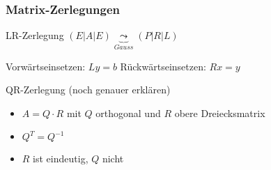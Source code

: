 \subsubsection{Matrix-Zerlegungen}

\begin{KR}{LR-Zerlegung}
    $(E | A | E) \underbrace{\leadsto}_{Gauss} (P | R | L)$
    
    Vorwärtseinsetzen: $Ly = b$
    Rückwärtseinsetzen: $Rx = y$
\end{KR}

\begin{KR}{QR-Zerlegung} (noch genauer erklären)
    \begin{itemize}
        \item $A = Q \cdot R$ mit $Q$ orthogonal und $R$ obere Dreiecksmatrix
        \item $Q^T = Q^{-1}$
        \item $R$ ist eindeutig, $Q$ nicht
    \end{itemize}
\end{KR}

































